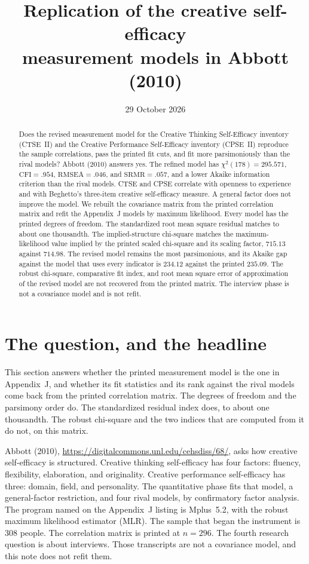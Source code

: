 \documentclass[11pt]{article}
\title{Replication of the creative self-efficacy\\
measurement models in Abbott (2010)}
\author{}
\date{29 October 2026}
\begin{document}
\maketitle

\begin{abstract}
Does the revised measurement model for the Creative Thinking
Self-Efficacy inventory (CTSE~II) and the Creative Performance
Self-Efficacy inventory (CPSE~II) reproduce the sample correlations,
pass the printed fit cuts, and fit more parsimoniously than the rival
models?
Abbott (2010) answers yes.
The refined model has \(\chi^2(178)=295.571\),
\(\mathrm{CFI}=.954\), \(\mathrm{RMSEA}=.046\), and
\(\mathrm{SRMR}=.057\), and a lower Akaike information criterion than
the rival models.
CTSE and CPSE correlate with openness to experience and with Beghetto's
three-item creative self-efficacy measure.
A general factor does not improve the model.
We rebuilt the covariance matrix from the printed correlation matrix
and refit the Appendix~J models by maximum likelihood.
Every model has the printed degrees of freedom.
The standardized root mean square residual matches to about one
thousandth.
The implied-structure chi-square matches the maximum-likelihood value
implied by the printed scaled chi-square and its scaling factor,
\(715.13\) against \(714.98\).
The revised model remains the most parsimonious, and its Akaike gap
against the model that uses every indicator is \(234.12\) against the
printed \(235.09\).
The robust chi-square, comparative fit index, and root mean square
error of approximation of the revised model are not recovered from the
printed matrix.
The interview phase is not a covariance model and is not refit.
\end{abstract}

\section{The question, and the headline}
\label{sec:headline}

This section answers whether the printed measurement model is the one
in Appendix~J, and whether its fit statistics and its rank against the
rival models come back from the printed correlation matrix.
The degrees of freedom and the parsimony order do.
The standardized residual index does, to about one thousandth.
The robust chi-square and the two indices that are computed from it do
not, on this matrix.

Abbott (2010),
\url{https://digitalcommons.unl.edu/cehsdiss/68/},
asks how creative self-efficacy is structured.
Creative thinking self-efficacy has four factors: fluency, flexibility,
elaboration, and originality.
Creative performance self-efficacy has three: domain, field, and
personality.
The quantitative phase fits that model, a general-factor restriction,
and four rival models, by confirmatory factor analysis.
The program named on the Appendix~J listing is Mplus~5.2, with the
robust maximum likelihood estimator (MLR).
The sample that began the instrument is \(308\) people.
The correlation matrix is printed at \(n=296\).
The fourth research question is about interviews.
Those transcripts are not a covariance model, and this note does not
refit them.
\end{document}
